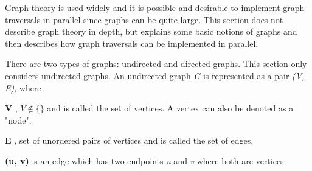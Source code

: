 Graph theory is used widely and it is possible and desirable to implement graph traversals in parallel since graphs can be quite large.
This section does not describe graph theory in depth, but explains some basic notions of graphs and then describes how graph traversals can be implemented in parallel.

There are two types of graphs: undirected and directed graphs.
This section only considers undirected graphs.
An undirected graph \textit{G} is represented as a pair \textit{(V, E)}, where
\begin{itemizeSmall}
	\item[\textbf{V}], $V\notin \{\}$ and is called the set of vertices. A vertex can also be denoted as a "node".
	\item[\textbf{E}], set of unordered pairs of vertices and is called the set of edges.
	\item[\textbf{(u, v)}] is an edge which has two endpoints \textit{u} and \textit{v} where both are vertices.
\end{itemizeSmall}

